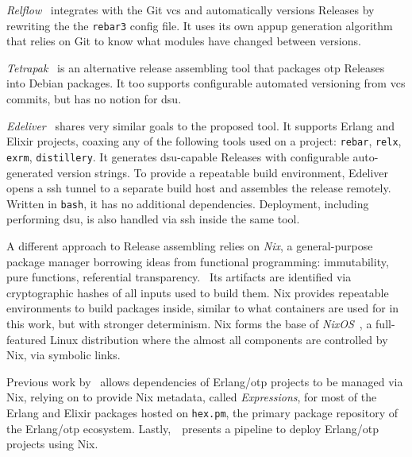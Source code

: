 \emph{Relflow}~\cite{relflow} integrates with the Git \acrshort{vcs} and automatically versions Releases by rewriting the the \lstinline|rebar3| config file. It uses its own \acrshort{appup} generation algorithm that relies on Git to know what modules have changed between versions.

\emph{Tetrapak}~\cite{tetrapak} is an alternative release assembling tool that packages \acrshort{otp} Releases into Debian packages. It too supports configurable automated versioning from \acrshort{vcs} commits, but has no notion for \acrshort{dsu}.

\emph{Edeliver}~\cite{edeliver,talk:edeliver} shares very similar goals to the proposed tool. It supports Erlang and Elixir projects, coaxing any of the following tools used on a project: \lstinline|rebar|, \lstinline|relx|, \lstinline|exrm|, \lstinline|distillery|. It generates \acrshort{dsu}-capable Releases with configurable auto-generated version strings. To provide a repeatable build environment, Edeliver opens a \acrfull{ssh} tunnel to a separate build host and assembles the release remotely. Written in \lstinline|bash|, it has no additional dependencies. Deployment, including performing \acrshort{dsu}, is also handled via \acrshort{ssh} inside the same tool.

A different approach to Release assembling relies on \emph{Nix}, a general-purpose package manager borrowing ideas from functional programming: immutability, pure functions, referential transparency.~\cite{nix1} Its artifacts are identified via cryptographic hashes of all inputs used to build them. Nix provides repeatable environments to build packages inside, similar to what containers are used for in this work, but with stronger determinism. Nix forms the base of \emph{NixOS}~\cite{nixos}, a full-featured Linux distribution where the almost all components are controlled by Nix, via symbolic links.

Previous work by~\cite{erlangnix} allows dependencies of Erlang/\acrshort{otp} projects to be managed via Nix, relying on \cite{hex2nix} to provide Nix metadata, called \emph{Expressions}, for most of the Erlang and Elixir packages hosted on \lstinline|hex.pm|, the primary package repository of the Erlang/\acrshort{otp} ecosystem. Lastly,~\cite{erlangnix2}~presents a pipeline to deploy Erlang/\acrshort{otp} projects using Nix.
